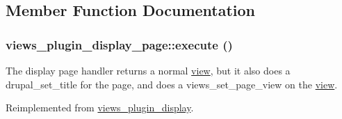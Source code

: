 \subsection{Member Function Documentation}
\hypertarget{classviews__plugin__display__page_a943b71fc873e5d09f548b69ba314b674}{
\subsubsection[{execute}]{\setlength{\rightskip}{0pt plus 5cm}views\_\-plugin\_\-display\_\-page::execute ()}}
\label{classviews__plugin__display__page_a943b71fc873e5d09f548b69ba314b674}
The display page handler returns a normal \hyperlink{classview}{view}, but it also does a drupal\_\-set\_\-title for the page, and does a views\_\-set\_\-page\_\-view on the \hyperlink{classview}{view}. 

Reimplemented from \hyperlink{classviews__plugin__display_af99c4a303d3e409ab7b14c6cfcd3a1d8}{views\_\-plugin\_\-display}.

